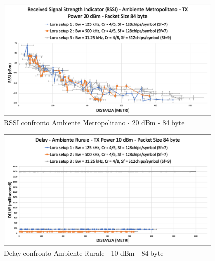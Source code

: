 \documentclass[12pt,a4paper,openright,twoside]{report}
\begin{document}
\begin{figure}[h]                      
\begin{center} 
\includegraphics[width=\textwidth]{RSSI_confronto_AM-20dBm-84byte.png}
\caption[RSSI confronto Ambiente Metropolitano - 20 dBm - 84 byte]{RSSI confronto Ambiente Metropolitano - 20 dBm - 84 byte}\label{fig:prima}
\end{center}
\end{figure}

\begin{figure}[h]                      
\begin{center} 
\includegraphics[width=\textwidth]{DELAY_confronto_AR_10dBm_84byte.png}
\caption[Delay confronto Ambiente Rurale - 10 dBm - 84 byte]{Delay confronto Ambiente Rurale - 10 dBm - 84 byte}\label{fig:prima}
\end{center}
\end{figure}
\end{document}
